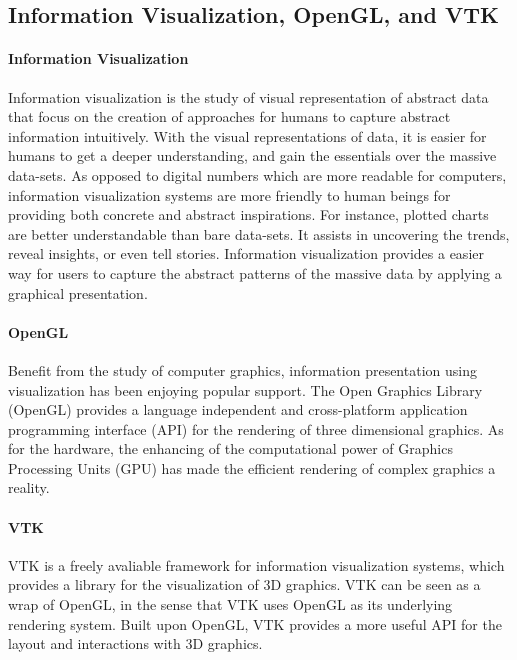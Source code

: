 \documentclass[runningheads]{llncs}
\newcommand\tool[1]{\textsf{#1}}
\begin{document}
\subsection{Information Visualization, \tool{OpenGL}, and \tool{VTK}}
\paragraph{Information Visualization}
Information visualization is the study of visual representation of abstract data that focus on the creation of approaches for humans to capture abstract information intuitively. With the visual representations of data, it is easier for humans to get a deeper understanding, and gain the essentials over the massive data-sets.
As opposed to digital numbers which are more readable for computers, information visualization systems are more friendly to human beings for providing both concrete and abstract inspirations. For instance, plotted charts are better understandable than bare data-sets. It assists in uncovering the trends, reveal insights, or even tell stories. Information visualization provides a easier way for users to capture the abstract patterns of the massive data by applying a graphical presentation.
 
\paragraph{\tool{OpenGL}}
Benefit from the study of computer graphics, information presentation using visualization has been enjoying popular support.  The Open Graphics Library (\textsf{OpenGL}) provides a language independent and cross-platform application programming interface (\textsf{API}) for the rendering of three dimensional graphics. As for the hardware, the enhancing of the computational power of Graphics Processing Units (\textsf{GPU}) has made the efficient rendering of complex graphics a reality. 


\paragraph{\tool{VTK}}
\tool{VTK} is a freely avaliable framework for information visualization systems, which provides a library for the visualization of 3D graphics. \tool{VTK} can be seen as a wrap of \tool{OpenGL}, in the sense that \tool{VTK} uses \tool{OpenGL} as its underlying rendering system. Built upon \tool{OpenGL}, \tool{VTK} provides a more useful \tool{API} for the layout and interactions with 3D graphics.
\end{document}
